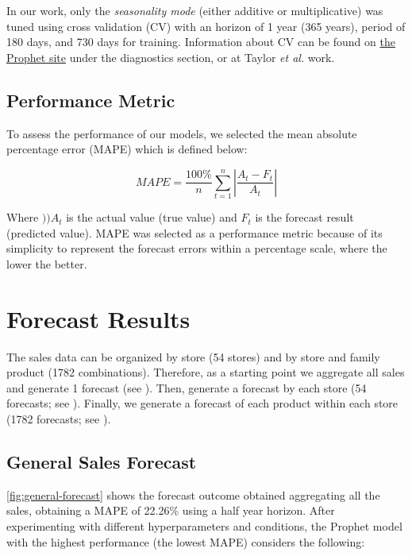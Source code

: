 In our work, only the \textit{seasonality mode}  (either additive or multiplicative)  was tuned using cross validation (CV) with an horizon of 1 year (365 years), period of 180 days, and 730 days for training. Information about CV can be found on \href{https://facebook.github.io/prophet/docs/installation.html}{the Prophet site} under the diagnostics section, or at Taylor \textit{et al.} work. 

\subsection[Performance Metric]{Performance Metric}
\label{sec:error}

To assess the performance of our models, we selected the mean absolute percentage error (MAPE) which is defined below:

\[ MAPE= \frac{100\%}{n} \sum_{t=1}^n \left| \frac{A_t - F_t}{A_t} \right|  \]

Where $))A_t$ is the actual value (true value) and $F_t$ is the forecast result (predicted value). MAPE was selected as a performance metric because of its simplicity to represent the forecast errors within a percentage scale, where the lower the better. 

\clearpage

\section[Forecast Results]{Forecast Results}
\label{sec:results}

The sales data can be organized by store (54 stores) and by store and family product (1782 combinations). Therefore, as a starting point we aggregate all sales and generate 1 forecast (see ). Then, generate a forecast by each store (54 forecasts; see ). Finally, we generate a forecast of each product within each store (1782 forecasts; see ).

\subsection[General Sales Forecast]{General Sales Forecast}
\label{sec:general}

\autoref{fig:general-forecast} shows the forecast outcome obtained aggregating all the sales, obtaining a MAPE of 22.26\% using a half year horizon. After experimenting with different hyperparameters and conditions,  the Prophet model with the highest performance (the lowest MAPE) considers the following: 


